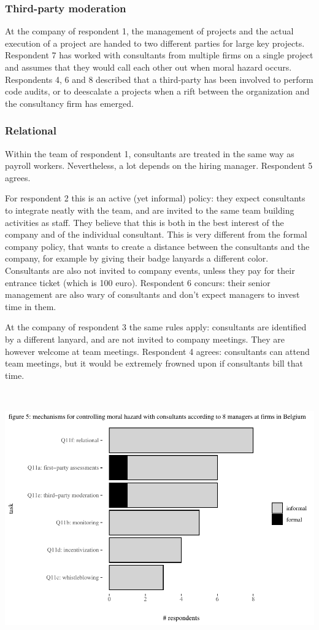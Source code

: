 \documentclass[12pt]{article}
\begin{document}
\subsubsection{Third-party moderation}\label{third-party-moderation-1}

At the company of respondent 1, the management of projects and the
actual execution of a project are handed to two different parties for
large key projects. Respondent 7 has worked with consultants from
multiple firms on a single project and assumes that they would call each
other out when moral hazard occurs. Respondents 4, 6 and 8 described
that a third-party has been involved to perform code audits, or to
deescalate a projects when a rift between the organization and the
consultancy firm has emerged.

\subsubsection{Relational}\label{relational-1}

Within the team of respondent 1, consultants are treated in the same way
as payroll workers. Nevertheless, a lot depends on the hiring manager.
Respondent 5 agrees.

For respondent 2 this is an active (yet informal) policy: they expect
consultants to integrate neatly with the team, and are invited to the
same team building activities as staff. They believe that this is both
in the best interest of the company and of the individual consultant.
This is very different from the formal company policy, that wants to
create a distance between the consultants and the company, for example
by giving their badge lanyards a different color. Consultants are also
not invited to company events, unless they pay for their entrance ticket
(which is 100 euro). Respondent 6 concurs: their senior management are
also wary of consultants and don't expect managers to invest time in
them.

At the company of respondent 3 the same rules apply: consultants are
identified by a different lanyard, and are not invited to company
meetings. They are however welcome at team meetings. Respondent 4
agrees: consultants can attend team meetings, but it would be extremely
frowned upon if consultants bill that time.

\(~\)

\begin{center}\includegraphics[width=0.75\linewidth]{2_ams_five_pager_files/figure-latex/unnamed-chunk-7-1} \end{center}
\end{document}
